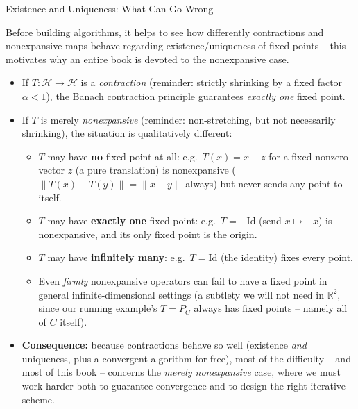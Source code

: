 \documentclass[aspectratio=169,10pt]{beamer}
\newcommand{\Hil}{\mathcal{H}}
\newcommand{\R}{\mathbb{R}}
\newcommand{\Id}{\mathrm{Id}}
\begin{document}
\begin{frame}[allowframebreaks]{Existence and Uniqueness: What Can Go Wrong}

Before building algorithms, it helps to see how differently contractions
and nonexpansive maps behave regarding existence/uniqueness of fixed
points -- this motivates why an entire book is devoted to the nonexpansive
case.

\begin{itemize}
  \item If $T:\Hil\to\Hil$ is a \emph{contraction} (reminder: strictly
    shrinking by a fixed factor $\alpha<1$), the Banach contraction
    principle guarantees \emph{exactly one} fixed point.
  \item If $T$ is merely \emph{nonexpansive} (reminder: non-stretching, but
    not necessarily shrinking), the situation is qualitatively different:
  \begin{itemize}
    \item $T$ may have \textbf{no} fixed point at all: e.g.\ $T(x)=x+z$ for
      a fixed nonzero vector $z$ (a pure translation) is nonexpansive
      ($\|T(x)-T(y)\|=\|x-y\|$ always) but never sends any point to itself.
    \item $T$ may have \textbf{exactly one} fixed point: e.g.\ $T=-\Id$
      (send $x\mapsto -x$) is nonexpansive, and its only fixed point is the
      origin.
    \item $T$ may have \textbf{infinitely many}: e.g.\ $T=\Id$ (the
      identity) fixes every point.
    \item Even \emph{firmly} nonexpansive operators can fail to have a
      fixed point in general infinite-dimensional settings (a subtlety we
      will not need in $\R^2$, since our running example's $T=P_C$ always
      has fixed points -- namely all of $C$ itself).
  \end{itemize}

\framebreak

  \item \textbf{Consequence:} because contractions behave so well
    (existence \emph{and} uniqueness, plus a convergent algorithm for
    free), most of the difficulty -- and most of this book -- concerns the
    \emph{merely nonexpansive} case, where we must work harder both to
    guarantee convergence and to design the right iterative scheme.
\end{itemize}

\end{frame}
\end{document}
